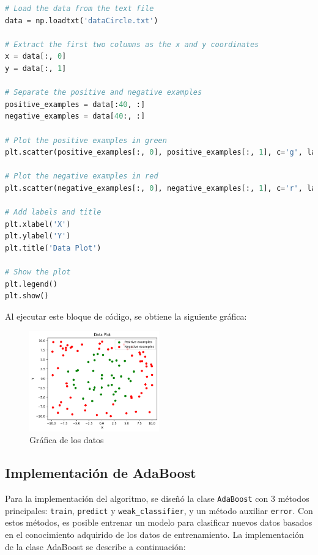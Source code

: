 \documentclass{article}
\begin{document}
    \begin{lstlisting}[language=Python, caption={Data processing}, label={lst:data_processing}]
# Load the data from the text file
data = np.loadtxt('dataCircle.txt')

# Extract the first two columns as the x and y coordinates
x = data[:, 0]
y = data[:, 1]

# Separate the positive and negative examples
positive_examples = data[:40, :]
negative_examples = data[40:, :]

# Plot the positive examples in green
plt.scatter(positive_examples[:, 0], positive_examples[:, 1], c='g', label='Positive examples')

# Plot the negative examples in red
plt.scatter(negative_examples[:, 0], negative_examples[:, 1], c='r', label='Negative examples')

# Add labels and title
plt.xlabel('X')
plt.ylabel('Y')
plt.title('Data Plot')

# Show the plot
plt.legend()
plt.show()
    \end{lstlisting}
    Al ejecutar este bloque de código, se obtiene la siguiente gráfica:
    \begin{figure}[h]
        \centering
        \includegraphics[width=0.5\textwidth]{img/data_plot}
        \caption{Gráfica de los datos}
        \label{fig:data_plot}
    \end{figure}

    \subsection{Implementación de AdaBoost}\label{subsec:implementacion_de_adaboost}

    Para la implementación del algoritmo, se diseñó la clase \texttt{AdaBoost} con 3 métodos principales:
    \texttt{train}, \texttt{predict} y \texttt{weak\_classifier}, y un método auxiliar \texttt{error}.
    Con estos métodos, es posible entrenar un modelo para clasificar nuevos datos
    basados en el conocimiento adquirido de los datos de entrenamiento.
    La implementación de la clase AdaBoost se describe a continuación:
\end{document}
